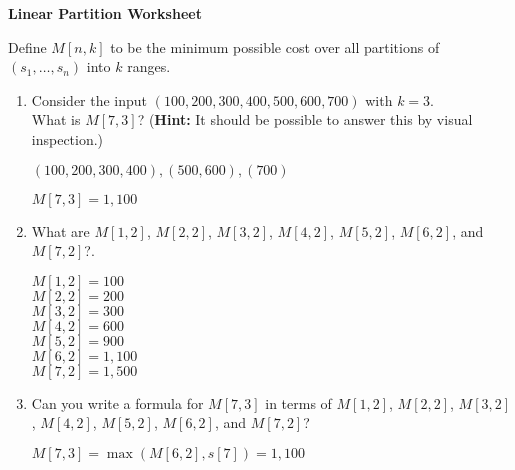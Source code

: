 \documentclass[12pt]{article}
\begin{document}
\newcommand{\I}{\mbox{{\em Int}}}
\newcommand{\lt}{\mbox{{\em left}}}
\newcommand{\rt}{\mbox{{\em right}}}
\newcommand{\ld}{\Delta^l}
\newcommand{\rd}{\Delta^r}
\newcommand{\lsp}[1]{\large\renewcommand{\baselinestretch}{#1}\normalsize}
\newcommand{\hsp}{\hspace{.2in}}

\def\Endwhile{\mbox{\bf endwhile\ }}
\def\Or{\mbox{\bf or\ }}
\def\Do{\mbox{\bf do\ }}
\def\Downto{\mbox{\bf downto\ }}
\def\Int{\mbox{\bf int\ }}
\def\To{\mbox{\bf to\ }}
\def\Repeat{\mbox{\bf repeat\ }}
\def\Until{\mbox{\bf until\ }}
\def\Return{\mbox{\bf return\ }}
\def\Not{\mbox{\bf not\ }}
\def\And{\mbox{\bf and\ }}
\def\For{\mbox{\bf for\ }}
\def\Foreach{\mbox{\bf foreach\ }}
\def\Else{\mbox{\bf else\ }}
\def\Elseif{\mbox{\bf elseif\ }}
\def\End{\mbox{\bf end\ }}
\def\If{\mbox{\bf if\ }}
\def\Mod{\mbox{\bf \ mod\ }}
\def\Then{\mbox{\bf then\ }}
\def\While{\mbox{\bf while\ }}
\def\Output{\mbox{\bf output\ }}


\lsp{1}
\pagestyle{plain}
\begin{center}
{\bf
Linear Partition Worksheet
}
\end{center}

Define $M[n,k]$ to be the minimum possible cost over all partitions of
$(s_1, \dots, s_n)$ into $k$ ranges. 

\begin{enumerate}
\item Consider the input $(100, 200, 300, 400, 500, 600, 700)$ with $k = 3$.\\
What is $M[7,3]$? ({\bf Hint:} It should be possible to answer this by visual inspection.)

$(100, 200, 300, 400), (500, 600), (700)$

$M[7,3] = 1,100$
\vspace*{1in}

\item What are $M[1,2]$, $M[2,2]$, $M[3,2]$, $M[4,2]$, $M[5,2]$, $M[6,2]$, 
and $M[7,2]$?. 

$M[1,2] = 100$\\
$M[2,2] = 200$\\
$M[3,2] = 300$\\
$M[4,2] = 600$\\
$M[5,2] = 900$\\
$M[6,2] = 1,100$\\
$M[7,2] = 1,500$
\vspace*{1in}

\item Can you write a formula for $M[7,3]$ in terms of $M[1,2]$, $M[2,2]$, 
$M[3,2]$, $M[4,2]$, $M[5,2]$, $M[6,2]$, and $M[7,2]$? 

$M[7,3] = \max(M[6,2], s[7]) = 1,100$
\end{enumerate}
 
\end{document}
